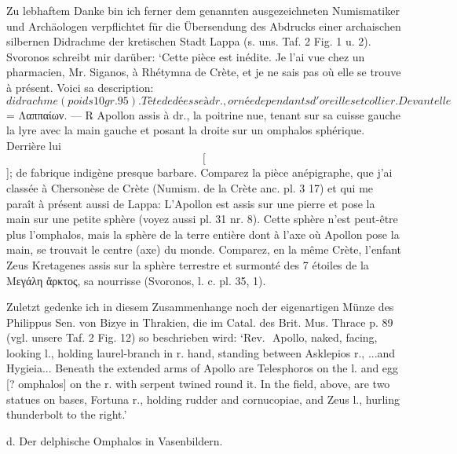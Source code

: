 \documentclass[a4paper, 11pt, oneside]{article}
\newcommand*\svgAAG{}
\newcommand*\svgAAH{}
\newcommand*\svgAAI{}
\newcommand*\svgAAJ{}
\newcommand*\svgAAK{}
\begin{document}
Zu lebhaftem Danke bin ich ferner dem genannten ausgezeichneten Numismatiker und Archäologen verpflichtet für die Übersendung des Abdrucks einer archaischen silbernen Didrachme der kretischen Stadt Lappa (s. uns. Taf. 2 Fig. 1 u. 2). Svoronos schreibt mir darüber: `Cette pièce est inédite. Je l'ai vue chez un pharmacien, Mr. Siganos, à Rhétymna de Crète, et je ne sais pas où elle se trouve à présent. Voici sa description: $\svgAAG$ didrachme (poids 10 gr. 95). Tête de déesse à dr., ornée de pendants d'oreilles et collier. Devant elle $\svgAAH$ = Λαππαίων. --- ℞ Apollon assis à dr., la poitrine nue, tenant sur sa cuisse gauche la lyre avec la main gauche et posant la droite sur un omphalos sphérique. Derrière lui $\svgAAI$[$\svgAAJ$]; de fabrique indigène presque barbare. Comparez la pièce anépigraphe, que j'ai classée à Chersonèse de Crète (Numism. de la Crète anc. pl. 3 17) et qui me paraît à présent aussi de Lappa: L'Apollon est assis sur une pierre et pose la main sur une petite sphère (voyez aussi pl. 31 nr. 8). Cette sphère n'est peut-être plus l'omphalos, mais la sphère de la terre entière dont à l'axe où Apollon pose la main, se trouvait le centre (axe) du monde. Comparez, en la même Crète, l'enfant Zeus Kretagenes assis sur la sphère terrestre et surmonté des 7 étoiles de la Μεγάλη ἄρκτος, sa nourrisse (Svoronos, l. c. pl. 35, 1).

Zuletzt gedenke ich in diesem Zusammenhange noch der eigenartigen Münze des Philippus Sen. von Bizye in Thrakien, die im Catal. des Brit. Mus. Thrace p. 89 (vgl. unsere Taf. 2 Fig. 12) so beschrieben wird: `Rev. $\svgAAK$ Apollo, naked, facing, looking l., holding laurel-branch in r. hand, standing between Asklepios r., ...and Hygieia... Beneath the extended arms of Apollo are Telesphoros on the l. and egg [? omphalos] on the r. with serpent twined round it. In the field, above, are two statues on bases, Fortuna r., holding rudder and cornucopiae, and Zeus l., hurling thunderbolt to the right.'
\begin{center}
d. Der delphische Omphalos in Vasenbildern.
\end{center}
\end{document}
